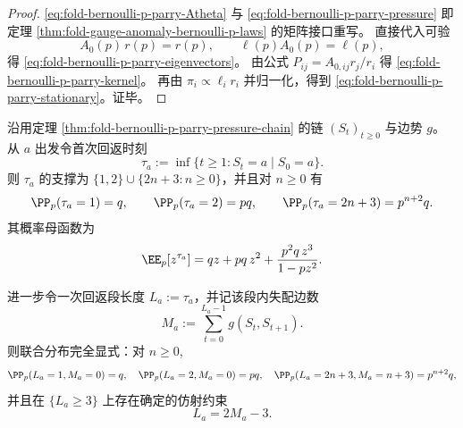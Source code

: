 \begin{proof}
\eqref{eq:fold-bernoulli-p-parry-Atheta} 与
\eqref{eq:fold-bernoulli-p-parry-pressure} 即
定理 \ref{thm:fold-gauge-anomaly-bernoulli-p-laws} 的矩阵接口重写。
直接代入可验
\[
A_0(p)\,r(p)=r(p),\qquad
\ell(p)A_0(p)=\ell(p),
\]
得 \eqref{eq:fold-bernoulli-p-parry-eigenvectors}。
由公式
\(
P_{ij}=A_{0,ij}r_j/r_i
\)
得 \eqref{eq:fold-bernoulli-p-parry-kernel}。
再由
\(
\pi_i\propto \ell_i r_i
\)
并归一化，得到 \eqref{eq:fold-bernoulli-p-parry-stationary}。证毕。
\end{proof}

\begin{proposition}[状态 \(a\) 的再生结构与回返时间的精确律]\label{prop:fold-bernoulli-p-return-time-a}
沿用定理 \ref{thm:fold-bernoulli-p-parry-pressure-chain} 的链 \((S_t)_{t\ge 0}\) 与边势 \(g\)。
从 \(a\) 出发令首次回返时刻
\[
\tau_a:=\inf\{t\ge 1:S_t=a\mid S_0=a\}.
\]
则 \(\tau_a\) 的支撑为 \(\{1,2\}\cup\{2n+3:n\ge 0\}\)，并且对 \(n\ge 0\) 有
\begin{equation}\label{eq:fold-bernoulli-p-return-time-a-law}
\PP_p(\tau_a=1)=q,\qquad
\PP_p(\tau_a=2)=pq,\qquad
\PP_p(\tau_a=2n+3)=p^{n+2}q.
\end{equation}
其概率母函数为
\begin{equation}\label{eq:fold-bernoulli-p-return-time-a-pgf}
\EE_p\!\left[z^{\tau_a}\right]
=qz+pq\,z^2+\frac{p^2q\,z^3}{1-pz^2}.
\end{equation}

进一步令一次回返段长度 \(L_a:=\tau_a\)，并记该段内失配边数
\[
M_a:=\sum_{t=0}^{L_a-1} g(S_t,S_{t+1}).
\]
则联合分布完全显式：对 \(n\ge 0\),
\begin{equation}\label{eq:fold-bernoulli-p-return-segment-a-joint}
\PP_p(L_a=1,M_a=0)=q,\quad
\PP_p(L_a=2,M_a=0)=pq,\quad
\PP_p(L_a=2n+3,M_a=n+3)=p^{n+2}q,
\end{equation}
并且在 \(\{L_a\ge 3\}\) 上存在确定的仿射约束
\begin{equation}\label{eq:fold-bernoulli-p-return-segment-a-affine}
L_a=2M_a-3.
\end{equation}
\end{proposition}
